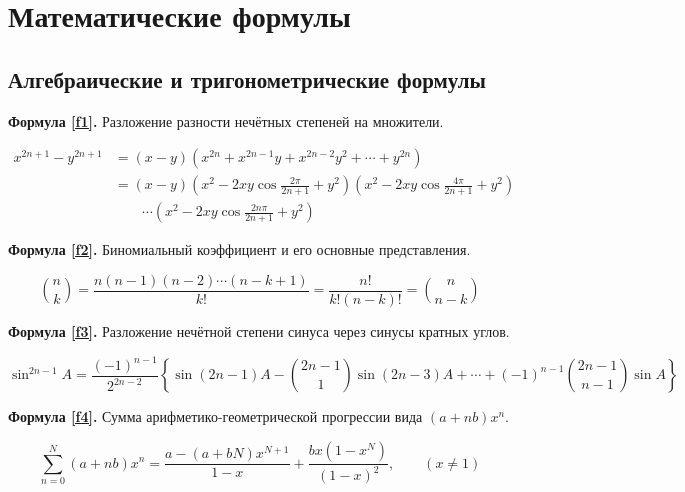 \documentclass[a4paper,12pt]{article}
\begin{document}
\tableofcontents
\thispagestyle{empty}
\newpage
\section{Математические формулы}

\subsection{Алгебраические и тригонометрические формулы}
\vspace{15pt}
\textbf{Формула \ref{f1}.}
Разложение разности нечётных степеней на множители.

\begin{equation}
\begin{split}
x^{2n+1}-y^{2n+1}&=(x-y)(x^{2n}+x^{2n-1}y+x^{2n-2}y^2+\cdots+y^{2n}) \\
&=(x-y)\left(x^2-2xy\cos\frac{2\pi}{2n+1}+y^2\right)\left(x^2-2xy\cos\frac{4\pi}{2n+1}+y^2\right) \\
&\qquad \cdots\left(x^2-2xy\cos\frac{2n\pi}{2n+1}+y^2\right)
\end{split}
\label{f1}
\end{equation}


\vspace{15pt}
\textbf{Формула \ref{f2}.}
Биномиальный коэффициент и его основные представления.

\begin{equation}
\binom{n}{k}=\frac{n(n-1)(n-2)\cdots(n-k+1)}{k!}=\frac{n!}{k!(n-k)!}=\binom{n}{n-k}
\label{f2}
\end{equation}


\vspace{15pt}
\textbf{Формула \ref{f3}.}
Разложение нечётной степени синуса через синусы кратных углов.

\begin{equation}
\sin^{2n-1} A=\frac{(-1)^{n-1}}{2^{2n-2}}\left\{\sin(2n-1)A-\binom{2n-1}{1}\sin(2n-3)A+\cdots+(-1)^{n-1}\binom{2n-1}{n-1}\sin A\right\}
\label{f3}
\end{equation}


\vspace{15pt}
\textbf{Формула \ref{f4}.}
Сумма арифметико-геометрической прогрессии вида $(a+nb)x^n$.

\begin{equation}
\sum_{n=0}^{N} (a+nb)x^n=\frac{a-(a+bN)x^{N+1}}{1-x}+
\frac{bx(1-x^N)}{(1-x)^2},\qquad (x \ne 1)
\label{f4}
\end{equation}
\end{document}
